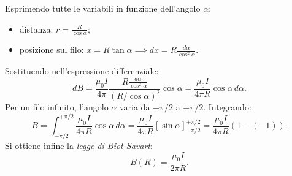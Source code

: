 \documentclass[a4paper,11pt]{report}
\begin{document}
Esprimendo tutte le variabili in funzione dell'angolo $\alpha$:
\begin{itemize}
    \item distanza: $r = \frac{R}{\cos\alpha}$;
    \item posizione sul filo: $x = R \tan\alpha \implies dx = R \frac{d\alpha}{\cos^2\alpha}$.
\end{itemize}
Sostituendo nell'espressione differenziale:
\begin{equation}
    dB = \frac{\mu_0 I}{4\pi} \frac{R \frac{d\alpha}{\cos^2\alpha}}{(R/\cos\alpha)^2} \cos\alpha = \frac{\mu_0 I}{4\pi R} \cos\alpha \, d\alpha.
\end{equation}
Per un filo infinito, l'angolo $\alpha$ varia da $-\pi/2$ a $+\pi/2$. Integrando:
\begin{equation}
    B = \int_{-\pi/2}^{+\pi/2} \frac{\mu_0 I}{4\pi R} \cos\alpha \, d\alpha = \frac{\mu_0 I}{4\pi R} [\sin\alpha]_{-\pi/2}^{+\pi/2} = \frac{\mu_0 I}{4\pi R} (1 - (-1)).
\end{equation}
Si ottiene infine la \textit{legge di Biot-Savart}:
\begin{equation}
    B(R) = \frac{\mu_0 I}{2\pi R}.
    \label{eq:filo_infinito}
\end{equation}
\end{document}
